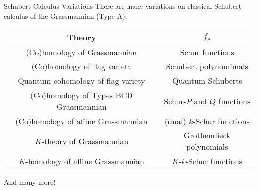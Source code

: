 \documentclass{beamer}
\DeclareMathOperator{\Gr}{Gr}
\begin{document}
\begin{frame}[fragile]{Schubert Calculus Variations}
    There are many variations on classical Schubert calculus of
    the Grassmannian (Type A).
    \pause
    \begin{tabular}{|c|c|}
      \hline
      Theory
      & \(f_\lambda\) \\
      \hline
      (Co)homology of Grassmannian
      & Schur functions\\
      \hline
      (Co)homology of flag variety
      & Schubert polynomimals\\
      \hline
      Quantum cohomology of flag variety
      & Quantum Schuberts\\
      \hline
      (Co)homology of Types BCD Grassmannian
      & Schur-\(P\) and \(Q\) functions\\
      \hline
      (Co)homology of affine Grassmannian
      & (dual) \(k\)-Schur functions\\
      \hline
      \(K\)-theory of Grassmannian
      & Grothendieck polynomials\\
      \hline
      \(K\)-homology of affine Grassmannian
      & \(K\)-\(k\)-Schur functions \\
      \hline
    \end{tabular}
    \pause And many more!
\end{frame}
\end{document}
